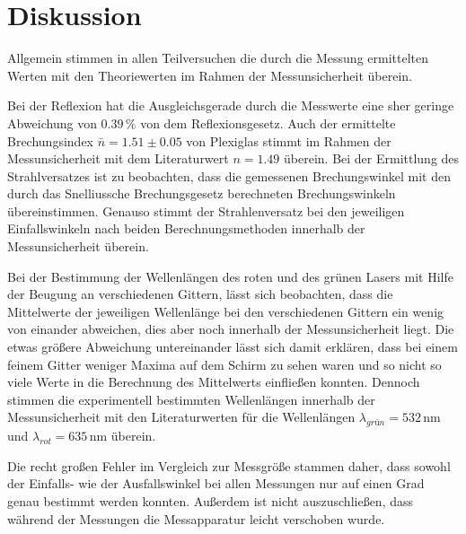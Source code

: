 \section{Diskussion}
\label{sec:Diskussion}

Allgemein stimmen in allen Teilversuchen die durch die Messung ermittelten Werten mit den Theoriewerten im Rahmen der Messunsicherheit 
überein. 

Bei der Reflexion hat die Ausgleichsgerade durch die Messwerte eine sher geringe Abweichung von $0.39\,\%$ von dem Reflexionsgesetz. Auch der
ermittelte Brechungsindex $\bar{n} =1.51 \pm 0.05$ von Plexiglas stimmt im Rahmen der Messunsicherheit mit dem Literaturwert $n = 1.49$ überein.
Bei der Ermittlung des Strahlversatzes ist zu beobachten, dass die gemessenen Brechungswinkel mit den durch das Snelliussche Brechungsgesetz berechneten
Brechungswinkeln übereinstimmen. Genauso stimmt der Strahlenversatz bei den jeweiligen Einfallswinkeln nach beiden Berechnungsmethoden innerhalb der
Messunsicherheit überein.

Bei der Bestimmung der Wellenlängen des roten und des grünen Lasers mit Hilfe der Beugung an verschiedenen Gittern, lässt sich beobachten, dass die 
Mittelwerte der jeweiligen Wellenlänge bei den verschiedenen Gittern ein wenig von einander abweichen, dies aber noch innerhalb der Messunsicherheit 
liegt. Die etwas größere Abweichung untereinander lässt sich damit erklären, dass bei einem feinem Gitter weniger Maxima auf dem Schirm zu sehen waren und 
so nicht so viele Werte in die Berechnung des Mittelwerts einfließen konnten. Dennoch stimmen die experimentell bestimmten Wellenlängen innerhalb 
der Messunsicherheit mit den Literaturwerten für die Wellenlängen $\lambda_{grün}=532\,\unit{\nano\meter}$ und $\lambda_{rot}=635\,\unit{\nano\meter}$
überein.

Die recht großen Fehler im Vergleich zur Messgröße stammen daher, dass sowohl der Einfalls- wie der Ausfallswinkel bei allen Messungen nur auf einen 
Grad genau bestimmt werden konnten. Außerdem ist nicht auszuschließen, dass während der Messungen die Messapparatur leicht verschoben wurde.